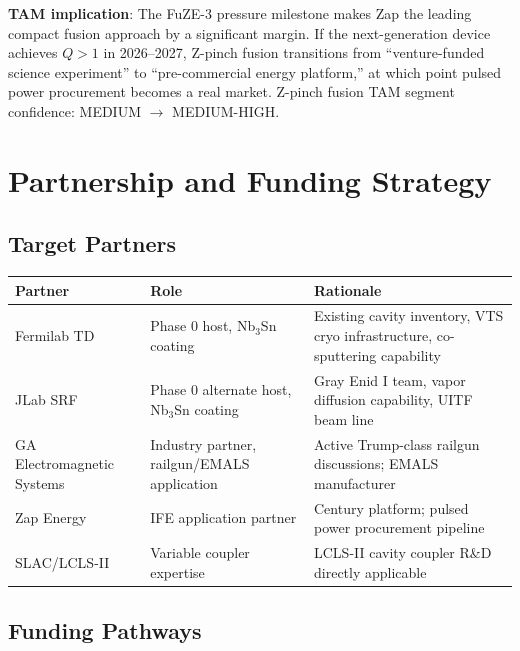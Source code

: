 \documentclass[11pt]{article}
\begin{document}
\textbf{TAM implication}: The FuZE-3 pressure milestone makes
Zap the leading compact fusion approach by a significant margin.
If the next-generation device achieves $Q > 1$ in 2026--2027,
Z-pinch fusion transitions from ``venture-funded science
experiment'' to ``pre-commercial energy platform,'' at which
point pulsed power procurement becomes a real market.
Z-pinch fusion TAM segment confidence: MEDIUM $\to$ MEDIUM-HIGH.

\section{Partnership and Funding Strategy}
\label{sec:partnerships}

\subsection{Target Partners}

\begin{center}
\begin{tabular}{p{3cm}p{3cm}p{5cm}}
\toprule
Partner & Role & Rationale \\
\midrule
Fermilab TD & Phase 0 host, Nb$_3$Sn coating & Existing cavity
  inventory, VTS cryo infrastructure, co-sputtering capability \\
JLab SRF & Phase 0 alternate host, Nb$_3$Sn coating &
  Gray Enid I team, vapor diffusion capability, UITF beam line \\
GA Electromagnetic Systems & Industry partner, railgun/EMALS
  application & Active Trump-class railgun discussions;
  EMALS manufacturer \\
Zap Energy & IFE application partner & Century platform;
  pulsed power procurement pipeline \\
SLAC/LCLS-II & Variable coupler expertise & LCLS-II cavity
  coupler R\&D directly applicable \\
\bottomrule
\end{tabular}
\end{center}

\subsection{Funding Pathways}
\end{document}
